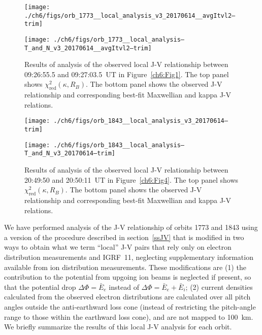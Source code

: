   \begin{figure}
    \centering
    \noindent\texttt{[image: ./ch6/figs/orb\_1773\_\_local\_analysis\_v3\_20170614\_\_avgItvl2--trim]}

    \vspace{1cm}

    \noindent\texttt{[image: ./ch6/figs/orb\_1773\_\_local\_analysis--T\_and\_N\_v3\_20170614\_\_avgItvl2--trim]}

    \caption[Orbit 1773: Reduced chi-squared values for local J-V relationship and
    corresponding best-fit curves.]{Results of analysis of the observed local
      J-V relationship between 09:26:55.5 and 09:27:03.5~UT in
      Figure~\ref{ch6:Fig1}. The top panel shows
      $\chi^2_{\mathrm{red}} ( \kappa, R_B)$. The bottom panel shows the
      observed J-V relationship and corresponding best-fit Maxwellian and kappa
      J-V relations.}
    \label{ch6:Fig7}
  \end{figure}



  \begin{figure}
    \centering

    \noindent\texttt{[image: ./ch6/figs/orb\_1843\_\_local\_analysis\_v3\_20170614--trim]}

    \vspace{1cm}

    \noindent\texttt{[image: ./ch6/figs/orb\_1843\_\_local\_analysis--T\_and\_N\_v3\_20170614--trim]}

    \caption[Orbit 1843: Reduced chi-squared values for local J-V relationship
    and corresponding best-fit curves.]{Results of analysis of the observed
      local J-V relationship between 20:49:50 and 20:50:11~UT in
      Figure~\ref{ch6:Fig4}. The top panel shows
      $\chi^2_{\mathrm{red}} ( \kappa, R_B)$. The bottom panel shows the
      observed J-V relationship and corresponding best-fit Maxwellian and kappa
      J-V relations.}
    \label{ch6:Fig8}
  \end{figure}


  We have performed analysis of the J-V relationship of orbits 1773 and 1843
  using a version of the procedure described in section~\ref{ssJV} that is
  modified in two ways to obtain what we term ``local'' J-V pairs that rely only
  on electron distribution measurements and IGRF~11, neglecting supplementary
  information available from ion distribution measurements. These modifications
  are (1) the contribution to the potential from upgoing ion beams is neglected
  if present, so that the potential drop $\Delta \Phi = \bar{E}_e$ instead of
  $\Delta \Phi = \bar{E}_e + \bar{E}_i$; (2) current densities calculated from
  the observed electron distributions are calculated over all pitch angles
  outside the anti-earthward loss cone (instead of restricting the pitch-angle
  range to those within the earthward loss cone), and are not mapped to
  100~km. We briefly summarize the results of this local J-V analysis for each
  orbit.

